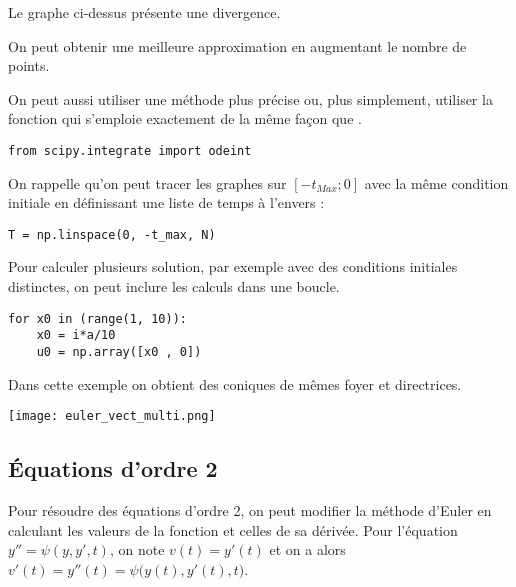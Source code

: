 \begin{enumerate}
\begin{minipage}{0.60\linewidth}
Le graphe ci-dessus présente une divergence. 

On peut obtenir une meilleure approximation en augmentant le nombre de points.

On peut aussi utiliser une méthode plus précise ou, plus simplement, utiliser la fonction  qui s'emploie exactement de la même façon que .
\begin{lstlisting}
from scipy.integrate import odeint
\end{lstlisting}
\item On rappelle qu'on peut tracer les graphes sur $[-t_{Max} ; 0]$ avec la même condition initiale en définissant une liste de temps à l'envers :
\begin{lstlisting}
T = np.linspace(0, -t_max, N)
\end{lstlisting}
\item Pour calculer plusieurs solution, par exemple avec des conditions initiales distinctes, on peut inclure les calculs dans une boucle.
\begin{lstlisting}
for x0 in (range(1, 10)):
    x0 = i*a/10
    u0 = np.array([x0 , 0])
\end{lstlisting}
Dans cette exemple on obtient des coniques de mêmes foyer et directrices.
\end{minipage}
\hfill
\begin{minipage}{0.35\linewidth}
\vspace{0pt}
\begin{center}
\texttt{[image: euler\_vect\_multi.png]}
\end{center}
\end{minipage}
\end{enumerate}
\subsection{Équations d'ordre 2}
Pour résoudre des équations d'ordre 2, on peut modifier la méthode d'Euler en calculant les valeurs de la fonction et celles de sa dérivée. Pour l'équation $y'' = \psi(y, y', t)$, on note $v(t) = y'(t)$ et on a alors 
$v'(t) = y''(t) = \psi\bigl(y(t), y'(t), t\bigr)$.

